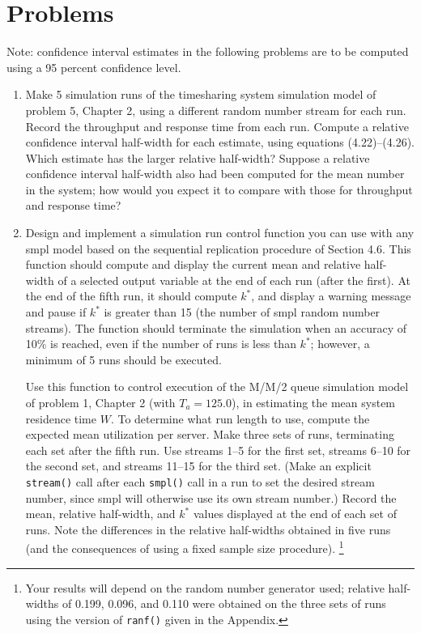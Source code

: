 \section{Problems}
\label{sec:output-problems}

Note: confidence interval estimates in the following problems are to be
computed using a 95 percent confidence level.

\begin{enumerate}
\item Make 5 simulation runs of the timesharing system simulation model of
  problem 5, Chapter 2, using a different random number stream for each run.
  Record the throughput and response time from each run. Compute a relative
  confidence interval half-width for each estimate, using equations
  (4.22)--(4.26). Which estimate has the larger relative half-width? Suppose a
  relative confidence interval half-width also had been computed for the mean
  number in the system; how would you expect it to compare with those for
  throughput and response time?

\item Design and implement a simulation run control function you can use with
  any smpl model based on the sequential replication procedure of Section 4.6.
  This function should compute and display the current mean and relative
  half-width of a selected output variable at the end of each run (after the
  first). At the end of the fifth run, it should compute $k^*$, and display a
  warning message and pause if $k^*$ is greater than 15 (the number of smpl
  random number streams). The function should terminate the simulation when an
  accuracy of 10\% is reached, even if the number of runs is less than $k^*$;
  however, a minimum of 5 runs should be executed.

  Use this function to control execution of the M/M/2 queue simulation model of
  problem 1, Chapter 2 (with $T_a = 125.0$), in estimating the mean system
  residence time $W$. To determine what run length to use, compute the expected
  mean utilization per server. Make three sets of runs, terminating each set
  after the fifth run. Use streams 1--5 for the first set, streams 6--10 for the
  second set, and streams 11--15 for the third set. (Make an explicit
  \texttt{stream()} call after each \texttt{smpl()} call in a run to set the
  desired stream number, since smpl will otherwise use its own stream number.)
  Record the mean, relative half-width, and $k^*$ values displayed at the end of
  each set of runs. Note the differences in the relative half-widths obtained
  in five runs (and the consequences of using a fixed sample size procedure).%
  \footnote{Your results will depend on the random number generator used;
  relative half-widths of 0.199, 0.096, and 0.110 were obtained on the three
  sets of runs using the version of \texttt{ranf()} given in the Appendix.}


\end{enumerate}
